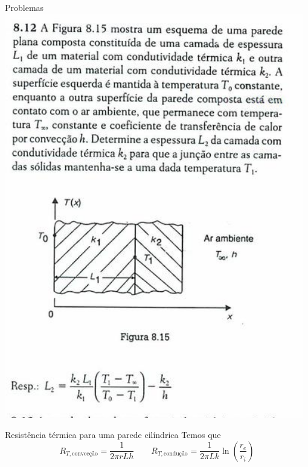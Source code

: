 \documentclass[t,%
brazilian,%
11pt,%
aspectratio=169,%
table%
]{beamer}
\begin{document}
\begin{frame}{Problemas}
    \centering
    \includegraphics[height=\textheight-28pt]{images/Captura de tela de 2025-06-24 15-43-56.png}
\end{frame}

\begin{frame}[c]{Resistência térmica para uma parede cilíndrica}
    Temos que
    \[
        R_{T,\text{convecção}} = \frac{1}{2\pi r L h} \quad \quad
        R_{T,\text{condução}} = \frac{1}{2\pi L k}\ln\left(\frac{r_e}{r_i}\right)
    \]
\end{frame}
\end{document}
